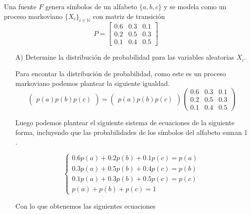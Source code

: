 
Una fuente $F$ genera símbolos de un alfabeto $\{a, b, c\}$ y se modela como un proceso markoviano $\{X_i\}_{i \in \mathbb{N}}$ con matriz de transición
\begin{equation*}
    P = \begin{bmatrix} 0\text{.}6 & 0\text{.}3 & 0\text{.}1 \\ 0\text{.}2 & 0\text{.}5 & 0\text{.}3 \\ 0\text{.}1 & 0\text{.}4 & 0\text{.}5 \end{bmatrix}
\end{equation*}

\begin{itemize}
    \item[A)] Determine la distribución de probabilidad para las variables aleatorias $X_i$.
    \begin{sol}
    Para encontar la distribución de probabilidad, como este es un proceso markoviano podemos plantear la siguiente igualdad.\\

$$
\begin{pmatrix}
p(a)
p(b) 
p(c)
\end{pmatrix}
=
\begin{pmatrix}
p(a) 
p(b) 
p(c)
\end{pmatrix}
\begin{pmatrix}
0.6 & 0.3 & 0.1 \\
0.2 & 0.5 & 0.3 \\
0.1 & 0.4 & 0.5
\end{pmatrix}
$$

Luego podemos plantear el siguiente sistema de ecuaciones de la siguiente forma, incluyendo que las probabilidades de los símbolos del alfabeto suman $1$.

$$
\begin{cases}
0.6p(a) + 0.2p(b) + 0.1p(c) = p(a) \\
0.3p(a) + 0.5p(b) + 0.4p(c) = p(b) \\
0.1p(a) + 0.3p(b) + 0.5p(c) = p(c) \\
p(a) + p(b) + p(c) = 1
\end{cases}
$$

Con lo que obtenemos las siguientes ecuaciones


\end{sol}
\end{itemize}
